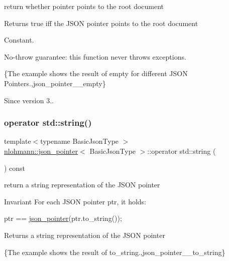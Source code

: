 return whether pointer points to the root document 

\begin{DoxyReturn}{Returns}
true iff the J\+S\+ON pointer points to the root document
\end{DoxyReturn}
Constant.

No-\/throw guarantee\+: this function never throws exceptions.

\{The example shows the result of {\ttfamily empty} for different J\+S\+ON Pointers.,json\+\_\+pointer\+\_\+\+\_\+empty\}

\begin{DoxySince}{Since}
version 3.. 
\end{DoxySince}
\mbox{\label{classnlohmann_1_1json__pointer_ae9015c658f99cf3d48a8563accc79988}} 
\subsubsection{\texorpdfstring{operator std\+::string()}{operator std::string()}}
{\footnotesize\ttfamily template$<$typename Basic\+Json\+Type $>$ \\
\hyperlink{classnlohmann_1_1json__pointer}{nlohmann\+::json\+\_\+pointer}$<$ Basic\+Json\+Type $>$\+::operator std\+::string (\begin{DoxyParamCaption}{ }\end{DoxyParamCaption}) const\hspace{0.3cm}{\ttfamily [inline]}}



return a string representation of the J\+S\+ON pointer 

\begin{DoxyInvariant}{Invariant}
For each J\+S\+ON pointer {\ttfamily ptr}, it holds\+: 
\begin{DoxyCode}
ptr == \hyperlink{classnlohmann_1_1json__pointer_a7f32d7c62841f0c4a6784cf741a6e4f8}{json\_pointer}(ptr.to\_string());
\end{DoxyCode}

\end{DoxyInvariant}
\begin{DoxyReturn}{Returns}
a string representation of the J\+S\+ON pointer
\end{DoxyReturn}
\{The example shows the result of {\ttfamily to\+\_\+string}.,json\+\_\+pointer\+\_\+\+\_\+to\+\_\+string\}

